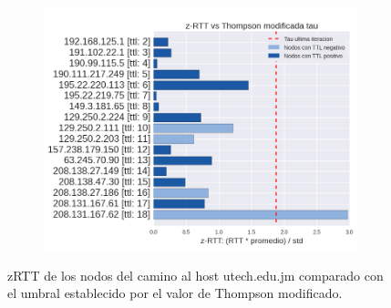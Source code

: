 \begin{figure}[h!]
  \begin{subfigure}[b]{.5\textwidth}
    \includegraphics[width=\textwidth]{Imagenes/jamaica_zrtts.png}
  \end{subfigure}
  \label{fig:jamaica_zrtts}
  \caption{zRTT de los nodos del camino al host utech.edu.jm comparado con el umbral establecido por el valor de Thompson modificado.}
\end{figure}

